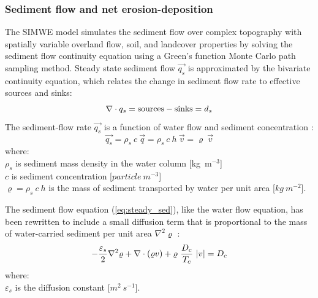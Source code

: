 \documentclass[gmd, manuscript]{copernicus}
\begin{document}
\subsubsection{Sediment flow and net erosion-deposition}

The SIMWE model simulates the sediment flow over complex topography 
with spatially variable overland flow, soil, and landcover properties 
by solving  the sediment flow continuity equation
using a Green's function Monte Carlo path sampling method.
Steady state sediment flow $\vec{q_s}$ is approximated by
the bivariate continuity equation, which relates 
the change in sediment flow rate to effective sources and sinks:
%
\begin{equation}
\label{eq:steady_sed}
\nabla\cdot \vec{q_s} = {\rm sources - sinks}= d_s
\end{equation}
%
\noindent
The sediment-flow rate $\vec{q_s}$ 
is a function of water flow and sediment concentration
\citep{Mitas1998}: %
%
\begin{equation}
\label{eq:sedflow}
\vec{q_s} = \rho_s~c~\vec{q} = \rho_s~c~h~\vec{v} = \varrho~\vec{v}
\end{equation}
{\small
\noindent
where: \\
\hspace*{0.5em} $\rho_s$ is sediment mass density in the water column [\unit{kg~m}$^{-3}$]\\
\hspace*{0.5em} $c$ is sediment concentration [$\unit{particle~m^{-3}}$]\\
\hspace*{0.5em} $\varrho = \rho_s~c~h$ is the mass of sediment transported by water per unit area [$\unit{kg~m^{-2}}$]. 
}

The sediment flow equation (\ref{eq:steady_sed}),
like the water flow equation, 
has been rewritten to include a small diffusion term that is
proportional to the mass of water-carried sediment per unit area 
$\nabla^2 \varrho$ \citep{Mitas1998}:
\begin{equation}
\label{eq:difsedim}
-{\varepsilon_s \over 2}\nabla^2 \varrho
+ \nabla\cdot (\varrho \vec{v})
 + \varrho~{D_c \over T_c}~|\vec{v}|
= D_c
\end{equation}
{\small
\noindent
where:\\
\noindent
\hspace*{0.5em} $\varepsilon_s$ is the diffusion constant [$\unit{m^2~s^{-1}}$].\\
}
\end{document}
